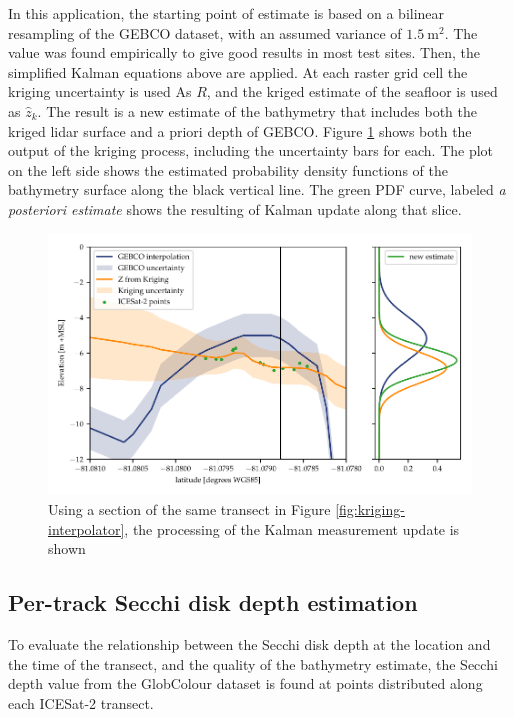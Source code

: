 In this application, the starting point of estimate is based on a bilinear resampling of the GEBCO dataset, with an assumed variance of $1.5~\text{m}^2$. The value was found empirically to give good results in most test sites. Then, the simplified Kalman equations above are applied. At each raster grid cell the kriging uncertainty is used As $R$, and the kriged estimate of the seafloor is used as $\hat{z}_k$. The result is a new estimate of the bathymetry that includes both the kriged lidar surface and a priori depth of GEBCO. Figure \ref{fig:kalman-figure} shows both the output of the kriging process, including the uncertainty bars for each. The plot on the left side shows the estimated probability density functions of the bathymetry surface along the black vertical line. The green PDF curve, labeled \emph{a posteriori estimate} shows the resulting of Kalman update along that slice.

\begin{figure}[htb]
    \centering
    \includegraphics[width=\textwidth]{figures/methodology-kalman-updating.pdf}
    \caption{Using a section of the same transect in Figure \ref{fig:kriging-interpolator}, the processing of the Kalman measurement update is shown}
    \label{fig:kalman-figure}
\end{figure}

\subsection{Per-track Secchi disk depth estimation}
To evaluate the relationship between the Secchi disk depth at the location and the time of the transect, and the quality of the bathymetry estimate, the Secchi depth value from the GlobColour dataset \parencite{Garnesson2019} is found at points distributed along each ICESat-2 transect. 

